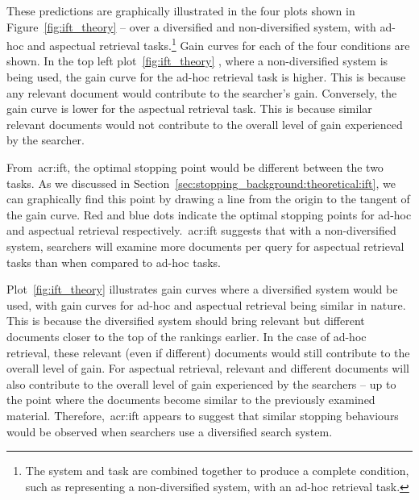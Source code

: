 These predictions are graphically illustrated in the four plots shown in Figure~\ref{fig:ift_theory} -- over a diversified  and non-diversified  system, with ad-hoc  and aspectual  retrieval tasks.\footnote{The system and task are combined together to produce a complete condition, such as  representing a non-diversified system, with an ad-hoc retrieval task.} Gain curves for each of the four conditions are shown. In the top left plot~\ref{fig:ift_theory} , where a non-diversified system is being used, the gain curve for the ad-hoc retrieval task is higher. This is because any relevant document would contribute to the searcher's gain. Conversely, the gain curve is lower for the aspectual retrieval task. This is because similar relevant documents would not contribute to the overall level of gain experienced by the searcher.

From~\gls{acr:ift}, the optimal stopping point would be different between the two tasks. As we discussed in Section~\ref{sec:stopping_background:theoretical:ift}, we can graphically find this point by drawing a line from the origin to the tangent of the gain curve. Red and blue dots indicate the optimal stopping points for ad-hoc and aspectual retrieval respectively.~\gls{acr:ift} suggests that with a non-diversified system, searchers will examine more documents per query for aspectual retrieval tasks than when compared to ad-hoc tasks.

Plot~\ref{fig:ift_theory}  illustrates gain curves where a diversified system would be used, with gain curves for ad-hoc and aspectual retrieval being similar in nature. This is because the diversified system should bring relevant but different documents closer to the top of the rankings earlier. In the case of ad-hoc retrieval, these relevant (even if different) documents would still contribute to the overall level of gain. For aspectual retrieval, relevant and different documents will also contribute to the overall level of gain experienced by the searchers -- up to the point where the documents become similar to the previously examined material. Therefore,~\gls{acr:ift} appears to suggest that similar stopping behaviours would be observed when searchers use a diversified search system.

